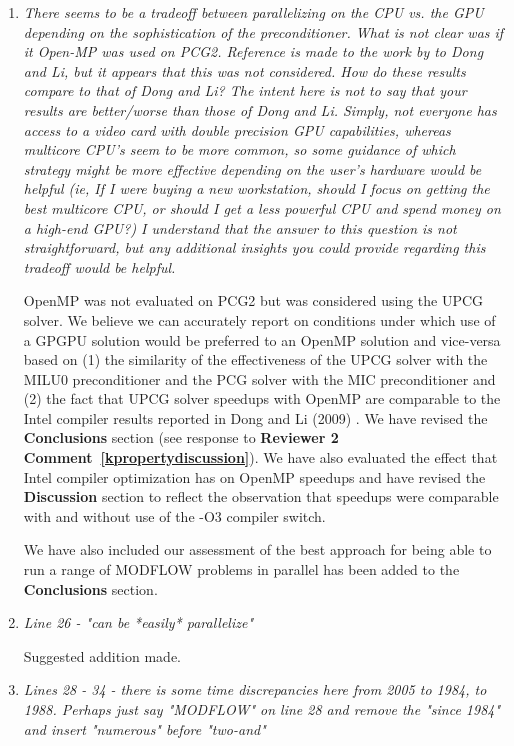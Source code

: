 \documentclass[12pt]{article} %
\begin{document}
\begin{enumerate}
\item \textit{There seems to be a tradeoff between parallelizing on the CPU vs. the GPU depending on the sophistication of the preconditioner. What is not clear was if it Open-MP was used on PCG2. Reference is made to the work by to Dong and Li, but it appears that this was not considered. How do these results compare to that of Dong and Li? The intent here is not to say that your results are better/worse than those of Dong and Li. Simply, not everyone has access to a video card with double precision GPU capabilities, whereas multicore CPU's seem to be more common, so some guidance of which strategy might be more effective depending on the user's hardware would be helpful (ie, If I were buying a new workstation, should I focus on getting the best multicore CPU, or should I get a less powerful CPU and spend money on a high-end GPU?) I understand that the answer to this question is not straightforward, but any additional insights you could provide regarding this tradeoff would be helpful.} 

OpenMP was not evaluated on PCG2 but was considered using the UPCG solver. We believe we can accurately report on conditions under which use of a GPGPU solution would be preferred to an OpenMP solution and vice-versa based on (1) the similarity of the effectiveness of the UPCG solver with the MILU0 preconditioner and the PCG solver with the MIC preconditioner and (2) the fact that UPCG solver speedups with OpenMP are comparable to the Intel compiler results reported in Dong and Li (2009) . We have revised the \textbf{Conclusions} section (see response to \textbf{Reviewer 2 Comment~\ref{kpropertydiscussion}}). We have also evaluated the effect that Intel compiler optimization has on OpenMP speedups and have revised the \textbf{Discussion} section to reflect the observation that speedups were comparable with and without use of the -O3 compiler switch.

We have also included our assessment of the best approach for being able to run a range of MODFLOW problems in parallel has been added to the \textbf{Conclusions} section.

\item \textit{Line 26 - "can be *easily* parallelize"} 

Suggested addition made. 

\item \textit{Lines 28 - 34 - there is some time discrepancies here from 2005 to 1984, to 1988. Perhaps just say "MODFLOW" on line 28 and remove the "since 1984" and insert "numerous" before "two-and" } 


\end{enumerate}
\end{document}
